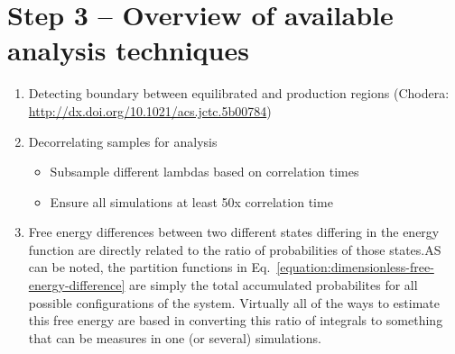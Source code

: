 \documentclass[9pt,bestpractices]{livecoms}
\begin{document}
\section{Step 3 -- Overview of available analysis techniques}
\label{sec:step3}
\begin{enumerate}

\item Detecting boundary between equilibrated and production regions (Chodera: \url{http://dx.doi.org/10.1021/acs.jctc.5b00784})
\item Decorrelating samples for analysis
\begin{itemize}
\item Subsample different lambdas based on correlation times
\item Ensure all simulations at least 50x correlation time
\end{itemize}

\item Free energy differences between two different states differing in the energy function are directly related to the
ratio of probabilities of those states.AS can be noted, the partition functions in Eq.~\ref{equation:dimensionless-free-energy-difference} are simply the total accumulated probabilites for all possible configurations of the system. Virtually all of the ways to estimate this free energy are based in converting this ratio of integrals to something that can be measures in one (or several) simulations.  


\end{enumerate}
\end{document}
